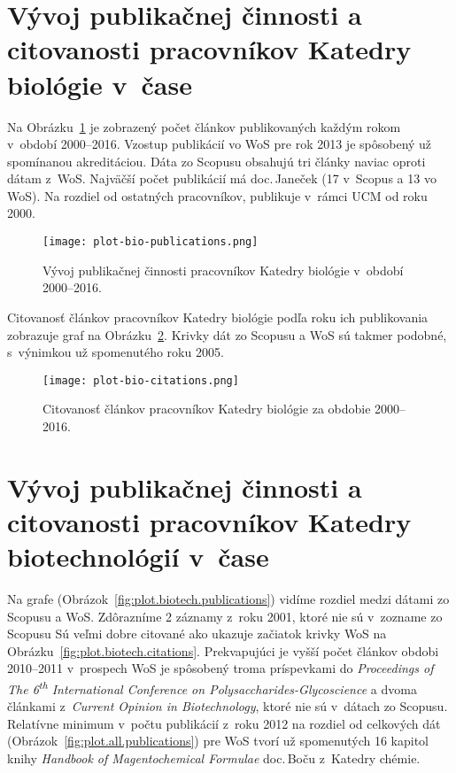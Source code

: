 \section{Vývoj publikačnej činnosti a citovanosti pracovníkov Katedry biológie
  v~čase}

Na Obrázku~\ref{fig:plot.bio.publications} je zobrazený počet článkov
publikovaných každým rokom v~období 2000--2016.  Vzostup publikácií vo WoS pre
rok 2013 je spôsobený už spomínanou akreditáciou.  Dáta zo Scopusu obsahujú tri
články naviac oproti dátam z~WoS.  Najväčší počet publikácií má doc.\,Janeček
(17 v~Scopus a 13 vo WoS).  Na rozdiel od ostatných pracovníkov, publikuje
v~rámci UCM od roku 2000.

\begin{figure}
  \centering
  \texttt{[image: plot-bio-publications.png]}
  \caption{Vývoj publikačnej činnosti pracovníkov Katedry biológie v~období
    2000--2016.}
  \label{fig:plot.bio.publications}
\end{figure}

Citovanosť článkov pracovníkov Katedry biológie podľa roku ich publikovania
zobrazuje graf na Obrázku~\ref{fig:plot.bio.citations}.  Krivky dát zo Scopusu a
WoS sú takmer podobné, s~výnimkou už spomenutého  roku 2005.

\begin{figure}
  \centering
  \texttt{[image: plot-bio-citations.png]}
  \caption{Citovanosť článkov pracovníkov Katedry biológie za obdobie
    2000--2016.}
  \label{fig:plot.bio.citations}
\end{figure}


\section{Vývoj publikačnej činnosti a citovanosti pracovníkov Katedry
  biotechnológií v~čase}

Na grafe (Obrázok~\ref{fig:plot.biotech.publications}) vidíme rozdiel medzi
dátami zo Scopusu a WoS.  Zdôrazníme 2 záznamy z~roku 2001, ktoré nie sú
v~zozname zo Scopusu Sú veľmi dobre citované ako ukazuje začiatok krivky WoS na
Obrázku~\ref{fig:plot.biotech.citations}.  Prekvapujúci je vyšší počet článkov
obdobi 2010--2011 v~prospech WoS je spôsobený troma príspevkami do
\emph{Proceedings of The 6\textsuperscript{th} International Conference on
  Polysaccharides-Glycoscience} a dvoma článkami z~\emph{Current Opinion in
  Biotechnology}, ktoré nie sú v~dátach zo Scopusu.  Relatívne minimum v~počtu
publikácií z~roku 2012 na rozdiel od celkových dát
(Obrázok~\ref{fig:plot.all.publications}) pre WoS tvorí už spomenutých 16
kapitol knihy \emph{Handbook of Magentochemical Formulae} doc.\,Boču z~Katedry
chémie.

